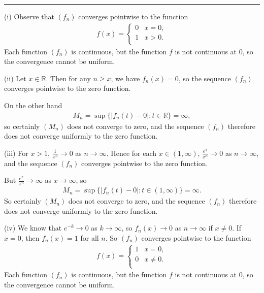 \documentclass[letterpaper,10pt,english]{jupyterBook}
\begin{document}
\bigskip\hrule\bigskip


\sphinxAtStartPar
{\hyperref[\detokenize{Problems:id55}]{}}
(i) Observe that \((f_n)\) converges pointwise to the function
\begin{equation*}
\begin{split}
f(x) = \left\{ \begin{array}{ll}
0 & x=0, \\
1 & x>0. \\
\end{array} \right.
\end{split}
\end{equation*}
\sphinxAtStartPar
Each function \((f_n)\) is continuous, but the function \(f\) is not continuous at \(0\), so the convergence cannot be uniform.

\sphinxAtStartPar
(ii) Let \(x\in \mathbb{R}\). Then for any \(n\geq x\), we have \(f_n (x) =0\), so the sequence \((f_n)\) converges pointwise to the zero function.

On the other hand
\begin{equation*}
\begin{split}
M_n = \sup \{ |f_n(t) -0| : t\in \mathbb{R} \} = \infty,
\end{split}
\end{equation*}
\sphinxAtStartPar
so certainly \((M_n)\) does not converge to zero, and the sequence \((f_n)\) therefore does not converge uniformly to the zero function.

\sphinxAtStartPar
(iii) For \(x>1\), \(\frac{1}{x^n} \rightarrow 0\) as \(n\rightarrow \infty\). Hence for each \(x\in (1,\infty )\), \(\frac{e^x}{x^n}\rightarrow 0\) as \(n\rightarrow \infty\), and the sequence \((f_n)\) converges pointwise to the zero function.

But \(\frac{e^x}{x^n}\rightarrow \infty\) as \(x\rightarrow \infty\), so
\begin{equation*}
\begin{split}
M_n = \sup \{ |f_n(t) -0| : t\in (1,\infty ) \} = \infty.
\end{split}
\end{equation*}
\sphinxAtStartPar
So certainly \((M_n)\) does not converge to zero, and the sequence \((f_n)\) therefore does not converge uniformly to the zero function.

\sphinxAtStartPar
(iv) We know that \(e^{-k}\rightarrow 0\) as \(k\rightarrow \infty\), so \(f_n(x)\rightarrow 0\) as \(n\rightarrow \infty\) if \(x\neq 0\). If \(x=0\), then \(f_n(x)=1\) for all \(n\). So \((f_n)\) converges pointwise to the function
\begin{equation*}
\begin{split}
f(x) = \left\{ \begin{array}{ll}
1 & x=0, \\
0 & x\neq 0. \\
\end{array} \right.
\end{split}
\end{equation*}
\sphinxAtStartPar
Each function \((f_n)\) is continuous, but the function \(f\) is not continuous at \(0\), so the convergence cannot be uniform.
\end{document}

